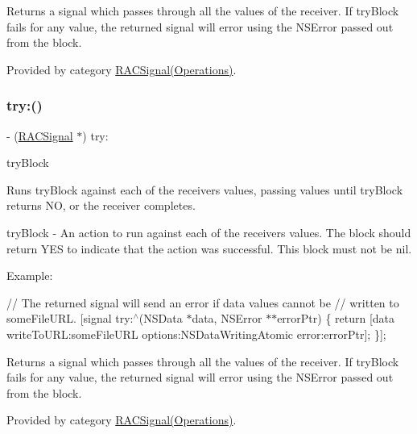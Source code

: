 Returns a signal which passes through all the values of the receiver. If {\ttfamily try\+Block} fails for any value, the returned signal will error using the {\ttfamily N\+S\+Error} passed out from the block. 

Provided by category \mbox{\hyperlink{category_r_a_c_signal_07_operations_08_ac65d7a1a19db9cb2f78c03781995bbe9}{R\+A\+C\+Signal(\+Operations)}}.

\mbox{\label{interface_r_a_c_signal_ac65d7a1a19db9cb2f78c03781995bbe9}} 
\subsubsection{\texorpdfstring{try\+:()}{try:()}\hspace{0.1cm}{\footnotesize\ttfamily [3/3]}}
{\footnotesize\ttfamily -\/ (\mbox{\hyperlink{interface_r_a_c_signal}{R\+A\+C\+Signal}} $\ast$) try\+: \begin{DoxyParamCaption}\item[{(B\+O\+OL($^\wedge$)(id value, N\+S\+Error $\ast$$\ast$error\+Ptr))}]{try\+Block }\end{DoxyParamCaption}}

Runs {\ttfamily try\+Block} against each of the receiver\textquotesingle{}s values, passing values until {\ttfamily try\+Block} returns NO, or the receiver completes.

try\+Block -\/ An action to run against each of the receiver\textquotesingle{}s values. The block should return Y\+ES to indicate that the action was successful. This block must not be nil.

Example\+:

// The returned signal will send an error if data values cannot be // written to {\ttfamily some\+File\+U\+RL}. \mbox{[}signal try\+:$^\wedge$(N\+S\+Data $\ast$data, N\+S\+Error $\ast$$\ast$error\+Ptr) \{ return \mbox{[}data write\+To\+U\+RL\+:some\+File\+U\+RL options\+:N\+S\+Data\+Writing\+Atomic error\+:error\+Ptr\mbox{]}; \}\mbox{]};

Returns a signal which passes through all the values of the receiver. If {\ttfamily try\+Block} fails for any value, the returned signal will error using the {\ttfamily N\+S\+Error} passed out from the block. 

Provided by category \mbox{\hyperlink{category_r_a_c_signal_07_operations_08_ac65d7a1a19db9cb2f78c03781995bbe9}{R\+A\+C\+Signal(\+Operations)}}.


